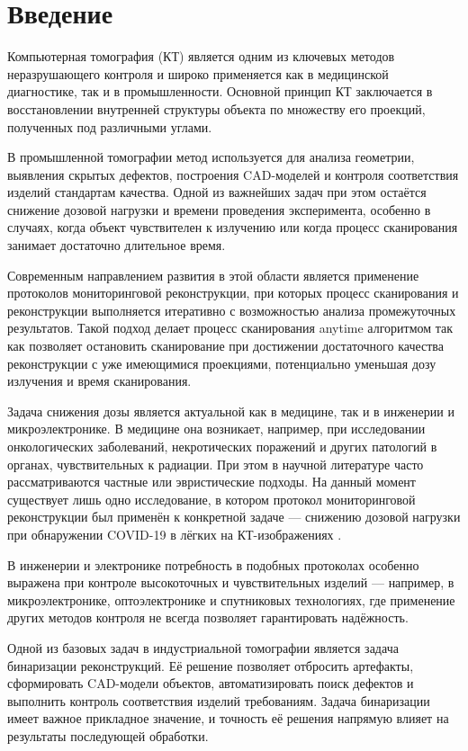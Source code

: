 \section{Введение}

Компьютерная томография (КТ) является одним из ключевых методов неразрушающего контроля и широко применяется как в медицинской диагностике, так и в промышленности. Основной принцип КТ заключается в восстановлении внутренней структуры объекта по множеству его проекций, полученных под различными углами.

В промышленной томографии метод используется для анализа геометрии, выявления скрытых дефектов, построения CAD-моделей и контроля соответствия изделий стандартам качества. Одной из важнейших задач при этом остаётся снижение дозовой нагрузки и времени проведения эксперимента, особенно в случаях, когда объект чувствителен к излучению или когда процесс сканирования занимает достаточно длительное время.

Современным направлением развития в этой области является применение протоколов мониторинговой реконструкции, при которых процесс сканирования и реконструкции выполняется итеративно с возможностью анализа промежуточных результатов. Такой подход делает процесс сканирования anytime алгоритмом так как позволяет остановить сканирование при достижении достаточного качества реконструкции с уже имеющимися проекциями, потенциально уменьшая дозу излучения и время сканирования.

Задача снижения дозы является актуальной как в медицине, так и в инженерии и микроэлектронике. В медицине она возникает, например, при исследовании онкологических заболеваний, некротических поражений и других патологий в органах, чувствительных к радиации. При этом в научной литературе часто рассматриваются частные или эвристические подходы. На данный момент существует лишь одно исследование, в котором протокол мониторинговой реконструкции был применён к конкретной задаче — снижению дозовой нагрузки при обнаружении COVID-19 в лёгких на КТ-изображениях \cite{bulatov2023reducing}.

В инженерии и электронике потребность в подобных протоколах особенно выражена при контроле высокоточных и чувствительных изделий — например, в микроэлектронике, оптоэлектронике и спутниковых технологиях, где применение других методов контроля не всегда позволяет гарантировать надёжность.

Одной из базовых задач в индустриальной томографии является задача бинаризации реконструкций. Её решение позволяет отбросить артефакты, сформировать CAD-модели объектов, автоматизировать поиск дефектов и выполнить контроль соответствия изделий требованиям. Задача бинаризации имеет важное прикладное значение, и точность её решения напрямую влияет на результаты последующей обработки.

